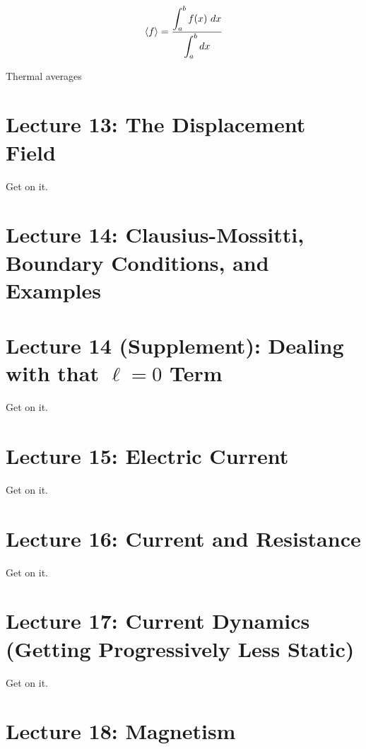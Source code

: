 \documentclass{article}
\numberwithin{equation}{section}
\begin{document}
\begin{equation*}
    \Braket{f} = \frac{\displaystyle \int_a^b f(x)\ dx}{\displaystyle \int_a^b dx}
\end{equation*}

Thermal averages 

\newpage

\section*{Lecture 13: The Displacement Field}
\setcounter{page}{1}

Get on it.

\newpage

\section*{Lecture 14: Clausius-Mossitti, Boundary Conditions, and Examples}
\setcounter{page}{1}


\newpage

\section*{Lecture 14 (Supplement): Dealing with that $\ell = 0$ Term}
\setcounter{page}{1}

Get on it.

\newpage

\section*{Lecture 15: Electric Current}
\setcounter{page}{1}

Get on it.

\newpage

\section*{Lecture 16: Current and Resistance}
\setcounter{page}{1}

Get on it.

\newpage

\section*{Lecture 17: Current Dynamics (Getting Progressively Less Static)}
\setcounter{page}{1}

Get on it.

\newpage

\section*{Lecture 18: Magnetism}
\setcounter{page}{1}
\end{document}
